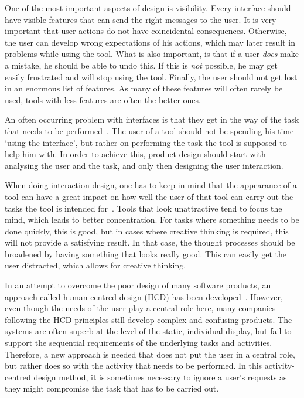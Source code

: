 One of the most important aspects of design is visibility. Every interface should have visible features that can send the right messages to the user. It is very important that user actions do not have coincidental consequences. Otherwise, the user can develop wrong expectations of his actions, which may later result in problems while using the tool. What is also important, is that if a user \emph{does} make a mistake, he should be able to undo this. If this is \emph{not} possible, he may get easily frustrated and will stop using the tool. Finally, the user should not get lost in an enormous list of features. As many of these features will often rarely be used, tools with less features are often the better ones.

An often occurring problem with interfaces is that they get in the way of the task that needs to be performed~\cite{norman1990interfaces}. The user of a tool should not be spending his time `using the interface', but rather on performing the task the tool is supposed to help him with. In order to achieve this, product design should start with analysing the user and the task, and only then designing the user interaction.

When doing interaction design, one has to keep in mind that the appearance of a tool can have a great impact on how well the user of that tool can carry out the tasks the tool is intended for~\cite{norman2002emotion}. Tools that look unattractive tend to focus the mind, which leads to better concentration. For tasks where something needs to be done quickly, this is good, but in cases where creative thinking is required, this will not provide a satisfying result. In that case, the thought processes should be broadened by having something that looks really good. This can easily get the user distracted, which allows for creative thinking.

In an attempt to overcome the poor design of many software products, an approach called human-centred design (HCD) has been developed~\cite{norman2005human}. However, even though the needs of the user play a central role here, many companies following the HCD principles still develop complex and confusing products. The systems are often superb at the level of the static, individual display, but fail to support the sequential requirements of the underlying tasks and activities. Therefore, a new approach is needed that does not put the user in a central role, but rather does so with the activity that needs to be performed. In this activity-centred design method, it is sometimes necessary to ignore a user's requests as they might compromise the task that has to be carried out.

